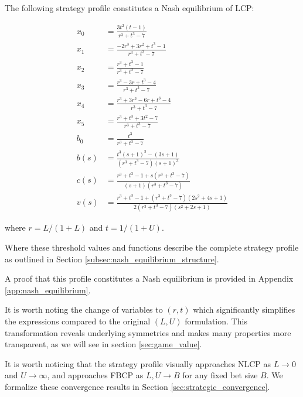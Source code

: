 \documentclass[../../main/main.tex]{subfiles}
\begin{document}
\pagebreak
\begin{theorem}
    \label{thm:nash_equilibrium}
The following strategy profile constitutes a Nash equilibrium of LCP:

\begin{align*}
    x_{0} &= \frac{3 t^{2} \left(t - 1\right)}{r^{3} + t^{3} - 7}\\
    x_{1} &= \frac{- 2 r^{3} + 3 r^{2} + t^{3} - 1}{r^{3} + t^{3} - 7}\\
    x_{2} &= \frac{r^{3} + t^{3} - 1}{r^{3} + t^{3} - 7}\\
    x_{3} &= \frac{r^{3} - 3 r + t^{3} - 4}{r^{3} + t^{3} - 7}\\
    x_{4} &= \frac{r^{3} + 3 r^{2} - 6 r + t^{3} - 4}{r^{3} + t^{3} - 7}\\
    x_{5} &= \frac{r^{3} + t^{3} + 3 t^{2} - 7}{r^{3} + t^{3} - 7}\\
    b_{0} &= \frac{t^{3}}{r^{3} + t^{3} - 7}\\
    b(s) &= \frac{t^{3} \left(s+1\right)^3 - (3s + 1)}{\left(r^{3} + t^{3} - 7\right) \left(s+1\right)^3}\\
    c(s) &= \frac{r^{3} + t^3 -1 + s \left(r^{3} + t^{3} - 7\right)}{\left(s + 1\right) \left(r^{3} + t^{3} - 7\right)}\\
    v(s) &= \frac{r^{3} + t^{3} -1 + \left(r^{3} + t^{3} - 7\right) \left(2 s^{2} + 4 s + 1\right)}{2 \left(r^{3} + t^{3} - 7\right) \left(s^{2} + 2 s + 1\right)}
\end{align*}

where $r = L/(1+L)$ and $t = 1/(1+U)$.

Where these threshold values and functions describe the complete strategy profile as outlined in Section \ref{subsec:nash_equilibrium_structure}.

\end{theorem}

A proof that this profile constitutes a Nash equilibrium is provided in Appendix \ref{app:nash_equilibrium}.

It is worth noting the change of variables to $(r, t)$ which significantly simplifies the expressions compared to the original $(L, U)$ formulation. This transformation reveals underlying symmetries and makes many properties more transparent, as we will see in section \ref{sec:game_value}.

It is worth noticing that the strategy profile visually approaches NLCP as $L \to 0$ and $U \to \infty$, and approaches FBCP as $L, U \to B$ for any fixed bet size $B$. We formalize these convergence results in Section \ref{sec:strategic_convergence}.
\end{document}
